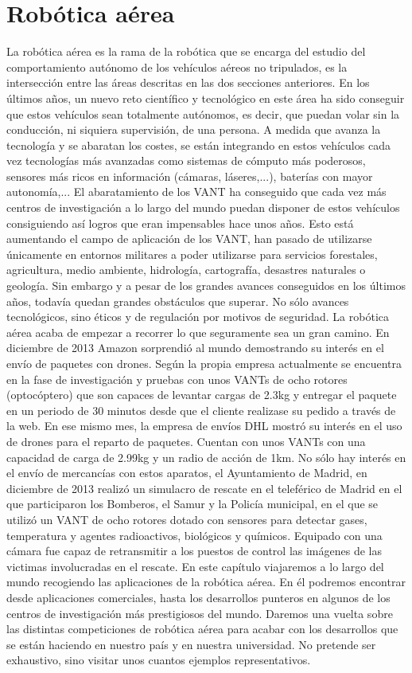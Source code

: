 \section{Robótica aérea}

La robótica aérea es la rama de la robótica que se encarga del estudio del comportamiento autónomo de
los vehículos aéreos no tripulados, es la intersección entre las áreas descritas en las dos secciones anteriores.
En los últimos años, un nuevo reto científico y tecnológico en este área ha sido conseguir que estos vehículos
sean totalmente autónomos, es decir, que puedan volar sin la conducción, ni siquiera supervisión, de una
persona.
A medida que avanza la tecnología y se abaratan los costes, se están integrando en estos vehículos
cada vez tecnologías más avanzadas como sistemas de cómputo más poderosos, sensores más ricos en
información (cámaras, láseres,...), baterías con mayor autonomía,... El abaratamiento de los VANT ha
conseguido que cada vez más centros de investigación a lo largo del mundo puedan disponer de estos
vehículos consiguiendo así logros que eran impensables hace unos años. Esto está aumentando el campo de
aplicación de los VANT, han pasado de utilizarse únicamente en entornos militares a poder utilizarse para
servicios forestales, agricultura, medio ambiente, hidrología, cartografía, desastres naturales o geología.
Sin embargo y a pesar de los grandes avances conseguidos en los últimos años, todavía quedan grandes
obstáculos que superar. No sólo avances tecnológicos, sino éticos y de regulación por motivos de seguridad.
La robótica aérea acaba de empezar a recorrer lo que seguramente sea un gran camino.
En diciembre de 2013 Amazon sorprendió al mundo demostrando su interés en el envío de paquetes
con drones. Según la propia empresa actualmente se encuentra en la fase de investigación y pruebas con
unos VANTs de ocho rotores (optocóptero) que son capaces de levantar cargas de 2.3kg y entregar el
paquete en un periodo de 30 minutos desde que el cliente realizase su pedido a través de la web. En ese
mismo mes, la empresa de envíos DHL mostró su interés en el uso de drones para el reparto de paquetes.
Cuentan con unos VANTs con una capacidad de carga de 2.99kg y un radio de acción de 1km. No sólo hay
interés en el envío de mercancías con estos aparatos, el Ayuntamiento de Madrid, en diciembre de 2013
realizó un simulacro de rescate en el teleférico de Madrid en el que participaron los Bomberos, el Samur
y la Policía municipal, en el que se utilizó un VANT de ocho rotores dotado con sensores para detectar
gases, temperatura y agentes radioactivos, biológicos y químicos. Equipado con una cámara fue capaz de
retransmitir a los puestos de control las imágenes de las victimas involucradas en el rescate.
En este capítulo viajaremos a lo largo del mundo recogiendo las aplicaciones de la robótica aérea. En
él podremos encontrar desde aplicaciones comerciales, hasta los desarrollos punteros en algunos de los
centros de investigación más prestigiosos del mundo. Daremos una vuelta sobre las distintas competiciones
de robótica aérea para acabar con los desarrollos que se están haciendo en nuestro país y en nuestra
universidad. No pretende ser exhaustivo, sino visitar unos cuantos ejemplos representativos.

